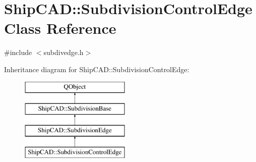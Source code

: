 \hypertarget{classShipCAD_1_1SubdivisionControlEdge}{\section{Ship\-C\-A\-D\-:\-:Subdivision\-Control\-Edge Class Reference}
\label{classShipCAD_1_1SubdivisionControlEdge}
}


{\ttfamily \#include $<$subdivedge.\-h$>$}

Inheritance diagram for Ship\-C\-A\-D\-:\-:Subdivision\-Control\-Edge\-:\begin{figure}[H]
\begin{center}
\leavevmode
\includegraphics[height=4.000000cm]{classShipCAD_1_1SubdivisionControlEdge}
\end{center}
\end{figure}
